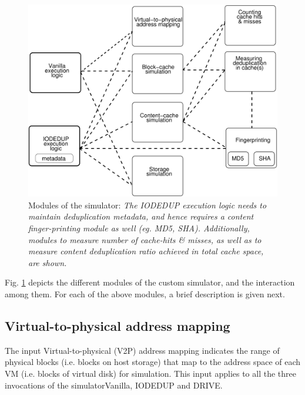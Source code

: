 
\begin{figure}[t]
    \centering
    \includegraphics[scale=0.6]{simreplaychap-figures/simreplay-interaction.pdf}
    \caption{Modules of the simulator: \textit{The IODEDUP execution logic 
		needs to maintain deduplication metadata, and hence requires a 
		content finger-printing module as well (eg. MD5, SHA). Additionally,
		modules to measure number of cache-hits \& misses, as well as
		to measure content deduplication ratio achieved in total cache space,
		are shown.}}
    \label{fig:simreplay-interaction}
\end{figure}

Fig. \ref{fig:simreplay-interaction} depicts the different modules 
of the custom simulator, and the interaction among them. For each of
the above modules, a brief description is given next.

\subsection{Virtual-to-physical address mapping}
\label{sec:simreplaychap-v2p}
The input Virtual-to-physical (V2P) address mapping
indicates the range of physical blocks (i.e. blocks on host storage)
that map to the address space of each VM (i.e. blocks of virtual disk)
for simulation. This input applies to all the three invocations
of the simulator\textemdash{}Vanilla, IODEDUP and DRIVE.

